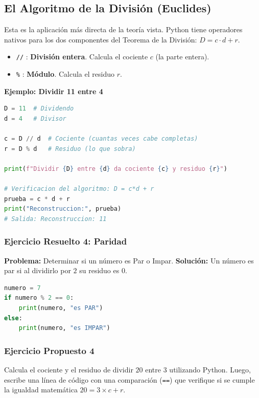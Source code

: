 \subsection{El Algoritmo de la División (Euclides)}
Esta es la aplicación más directa de la teoría vista. Python tiene operadores nativos para los dos componentes del Teorema de la División: $D = c \cdot d + r$.
\begin{itemize}
    \item \texttt{//} : \textbf{División entera}. Calcula el cociente $c$ (la parte entera).
    \item \texttt{\%} : \textbf{Módulo}. Calcula el residuo $r$.
\end{itemize}

\textbf{Ejemplo: Dividir 11 entre 4}
\begin{lstlisting}[language=Python]
D = 11  # Dividendo
d = 4   # Divisor

c = D // d  # Cociente (cuantas veces cabe completas)
r = D % d   # Residuo (lo que sobra)

print(f"Dividir {D} entre {d} da cociente {c} y residuo {r}")

# Verificacion del algoritmo: D = c*d + r
prueba = c * d + r
print("Reconstruccion:", prueba) 
# Salida: Reconstruccion: 11
\end{lstlisting}

\subsubsection*{Ejercicio Resuelto 4: Paridad}
\textbf{Problema:} Determinar si un número es Par o Impar.
\textbf{Solución:} Un número es par si al dividirlo por $2$ su residuo es $0$.

\begin{lstlisting}[language=Python]
numero = 7
if numero % 2 == 0:
    print(numero, "es PAR")
else:
    print(numero, "es IMPAR")
\end{lstlisting}

\subsubsection*{Ejercicio Propuesto 4}
Calcula el cociente y el residuo de dividir $20$ entre $3$ utilizando Python. Luego, escribe una línea de código con una comparación (\texttt{==}) que verifique si se cumple la igualdad matemática $20 = 3 \times c + r$.


